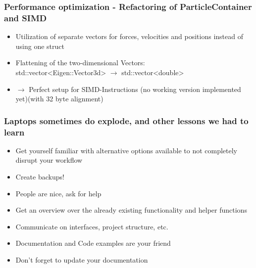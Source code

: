 \begin{frame}
	\frametitle{Performance optimization - Refactoring of ParticleContainer and SIMD}
	\large
	\vspace{1cm}
	\begin{itemize}
	\item<1-> Utilization of separate vectors for forces, velocities and positions instead of using one struct
	\item<2-> Flattening of the two-dimensional Vectors: \\
	std::vector<Eigen::Vector3d> $\rightarrow$ std::vector<double> \\
	\item<3->[]\Large $\longrightarrow$ Perfect setup for SIMD-Instructions (no working version implemented yet)(with 32 byte alignment)
	
	\end{itemize}
	
\end{frame}

\begin{frame}
	\frametitle{Laptops sometimes do explode, and other lessons we had to learn}
	\large
	\begin{itemize}
	\item<1-> Get yourself familiar with alternative options available to not completely disrupt your workflow
	\item<2-> Create backups!
	\item<3-> People are nice, ask for help
	\item<4->  Get an overview over the already existing functionality and helper functions
	\item<5->  Communicate on interfaces, project structure, etc.
	\item<6-> Documentation and Code examples are your friend

	\item<7-> Don't forget to update your documentation
	\end{itemize}
	
\end{frame}





